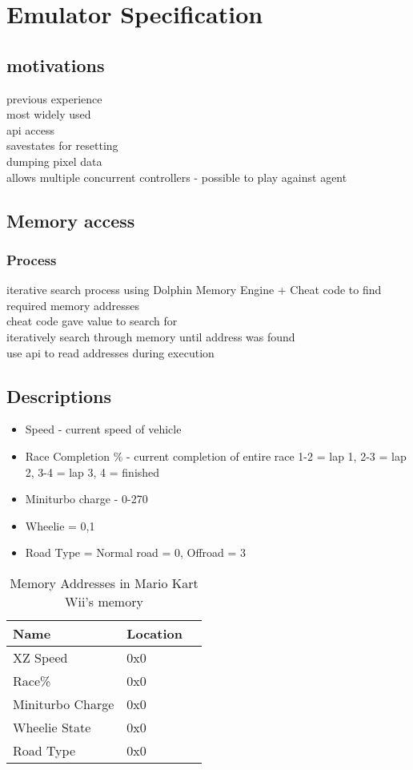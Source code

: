 
\chapter{Emulator Specification}
\section{motivations}
previous experience\\ 
most widely used\\
api access\\
savestates for resetting\\
dumping pixel data\\
allows multiple concurrent controllers - possible to play against agent\\

\section{Memory access}
\subsection{Process}
iterative search process using Dolphin Memory Engine + Cheat code to find required memory addresses
\\cheat code gave value to search for
\\ iteratively search through memory until address was found 
\\ use api to read addresses during execution
\section{Descriptions}
\begin{itemize}
    \item Speed - current speed of vehicle
    \item Race Completion \% - current completion of entire race 1-2 = lap 1, 2-3 = lap 2, 3-4 = lap 3, 4 = finished
    \item Miniturbo charge - 0-270
    \item Wheelie = 0,1
    \item Road Type = Normal road = 0, Offroad = 3
\end{itemize}
\begin{table}[h]
    \centering
    \begin{tabular}{l|l|c}
    \textbf{Name}  & \textbf{Location}\\
    \hline
     XZ Speed  &    0x0\\
     Race\%  &   0x0\\
     Miniturbo Charge &  0x0 \\
     Wheelie State &  0x0 \\
     Road Type &  0x0 \\
    \end{tabular}
    \caption{Memory Addresses in Mario Kart Wii's memory}
    \label{tab:memory-addresses}
\end{table}